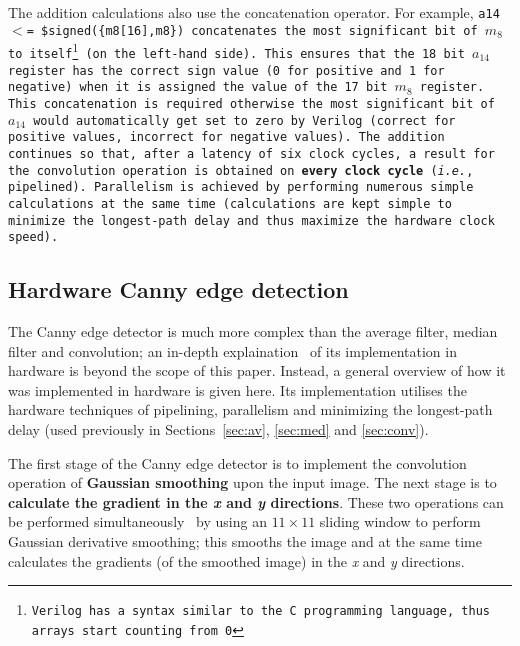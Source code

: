 \documentclass[10pt,twocolumn,letterpaper]{article}
\begin{document}
The addition calculations also use the concatenation operator. For example,
\tt \footnotesize a14 $<$= \$signed(\{m8[16],m8\}) \normalsize \rm concatenates
the most significant bit of 
$m_{8}$ to itself\footnote{Verilog has a syntax similar to the C programming language, 
thus arrays start counting from 0}
(on the left-hand side).
This ensures
that the 18 bit 
$a_{14}$ register has the correct sign value (0 for positive and 1 for negative)
when it is assigned the value of the 17 bit 
$m_{8}$ register.
This concatenation is required otherwise the most significant bit of  
$a_{14}$ would automatically get set to zero by Verilog 
(correct for positive values, incorrect for negative values).
The addition continues 
so that, after a latency of six clock cycles, a result for the convolution
operation is obtained on {\bf every clock cycle} (\emph{i.e.}, pipelined). 
Parallelism is achieved by performing numerous simple calculations at the same time
(calculations are kept simple to minimize the longest-path delay and thus maximize the hardware clock speed).


\subsection{Hardware Canny edge detection}
\label{sec:hwcanny}
The Canny edge detector is much more complex than the average filter, median filter and convolution; an in-depth
explaination~\cite{msp05, canny86, IPtechreport_MSThesis} of its implementation in hardware is beyond the scope of this paper. 
Instead, a general overview of how it was implemented in hardware is given here. 
Its implementation utilises the hardware techniques of 
pipelining, parallelism and minimizing the longest-path delay (used previously in Sections~\ref{sec:av}, \ref{sec:med} 
and \ref{sec:conv}).

The first stage of the Canny edge detector is to implement the convolution operation of {\bf Gaussian smoothing} upon the input image.
The next stage is to {\bf calculate the gradient in the \emph{x} and \emph{y} directions}.
These two operations can be performed simultaneously~\cite{msp05} by 
using an $11\times11$ sliding window to perform Gaussian derivative smoothing;
this smooths the image and at the same time calculates the gradients (of the smoothed image) in the \emph{x} and \emph{y} directions.
\end{document}
